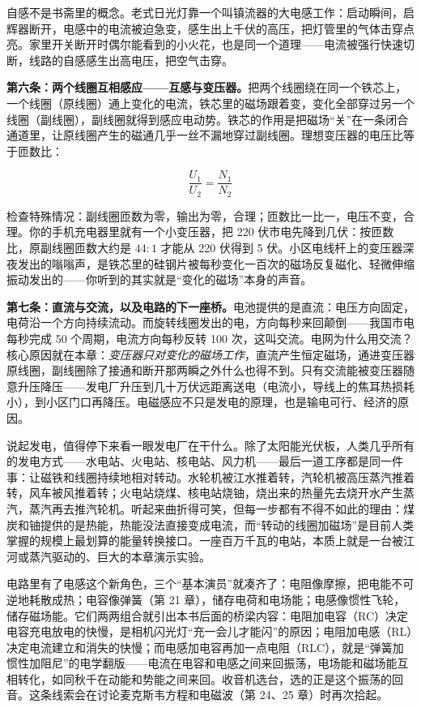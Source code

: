 自感不是书斋里的概念。老式日光灯靠一个叫镇流器的大电感工作：启动瞬间，启辉器断开，电感中的电流被迫急变，感生出上千伏的高压，把灯管里的气体击穿点亮。家里开关断开时偶尔能看到的小火花，也是同一个道理——电流被强行快速切断，线路的自感感生出高电压，把空气击穿。

\textbf{第六条：两个线圈互相感应——互感与变压器。}把两个线圈绕在同一个铁芯上，一个线圈（原线圈）通上变化的电流，铁芯里的磁场跟着变，变化全部穿过另一个线圈（副线圈），副线圈就得到感应电动势。铁芯的作用是把磁场“关”在一条闭合通道里，让原线圈产生的磁通几乎一丝不漏地穿过副线圈。理想变压器的电压比等于匝数比：

\[
\frac{U_1}{U_2}=\frac{N_1}{N_2}
\]

检查特殊情况：副线圈匝数为零，输出为零，合理；匝数比一比一，电压不变，合理。你的手机充电器里就有一个小变压器，把 220 伏市电先降到几伏：按匝数比，原副线圈匝数大约是 \(44:1\) 才能从 220 伏得到 5 伏。小区电线杆上的变压器深夜发出的嗡嗡声，是铁芯里的硅钢片被每秒变化一百次的磁场反复磁化、轻微伸缩振动发出的——你听到的其实就是“变化的磁场”本身的声音。

\textbf{第七条：直流与交流，以及电路的下一座桥。}电池提供的是直流：电压方向固定，电荷沿一个方向持续流动。而旋转线圈发出的电，方向每秒来回颠倒——我国市电每秒完成 50 个周期，电流方向每秒反转 100 次，这叫交流。电网为什么用交流？核心原因就在本章：\emph{变压器只对变化的磁场工作}，直流产生恒定磁场，通进变压器原线圈，副线圈除了接通和断开那两瞬之外什么也得不到。只有交流能被变压器随意升压降压——发电厂升压到几十万伏远距离送电（电流小，导线上的焦耳热损耗小），到小区门口再降压。电磁感应不只是发电的原理，也是输电可行、经济的原因。

说起发电，值得停下来看一眼发电厂在干什么。除了太阳能光伏板，人类几乎所有的发电方式——水电站、火电站、核电站、风力机——最后一道工序都是同一件事：让磁铁和线圈持续地相对转动。水轮机被江水推着转，汽轮机被高压蒸汽推着转，风车被风推着转；火电站烧煤、核电站烧铀，烧出来的热量先去烧开水产生蒸汽，蒸汽再去推汽轮机。听起来曲折得可笑，但每一步都有不得不如此的理由：煤炭和铀提供的是热能，热能没法直接变成电流，而“转动的线圈加磁场”是目前人类掌握的规模上最划算的能量转换接口。一座百万千瓦的电站，本质上就是一台被江河或蒸汽驱动的、巨大的本章演示实验。

电路里有了电感这个新角色，三个“基本演员”就凑齐了：电阻像摩擦，把电能不可逆地耗散成热；电容像弹簧（第 21 章），储存电荷和电场能；电感像惯性飞轮，储存磁场能。它们两两组合就引出本书后面的桥梁内容：电阻加电容（RC）决定电容充电放电的快慢，是相机闪光灯“充一会儿才能闪”的原因；电阻加电感（RL）决定电流建立和消失的快慢；而电感加电容再加一点电阻（RLC），就是“弹簧加惯性加阻尼”的电学翻版——电流在电容和电感之间来回振荡，电场能和磁场能互相转化，如同秋千在动能和势能之间来回。收音机选台，选的正是这个振荡的回音。这条线索会在讨论麦克斯韦方程和电磁波（第 24、25 章）时再次拾起。


